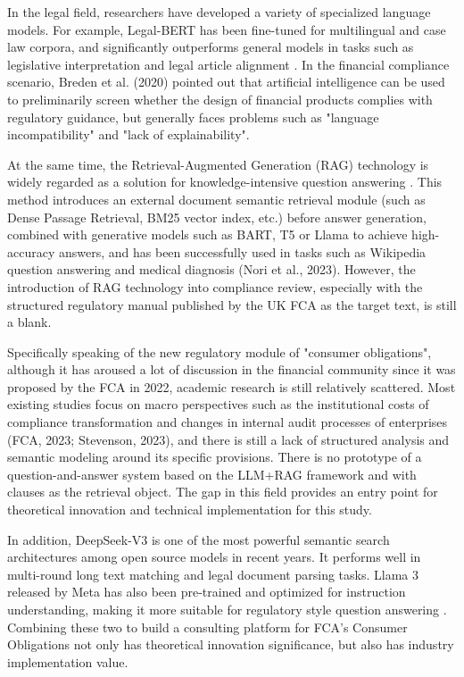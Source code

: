 \documentclass[a4paper,11pt]{article}
\begin{document}
In the legal field, researchers have developed a variety of specialized language models. For example, Legal-BERT has been fine-tuned for multilingual and case law corpora, and significantly outperforms general models in tasks such as legislative interpretation and legal article alignment \cite{chalkidis2020legalbert}. In the financial compliance scenario, Breden et al. (2020) pointed out that artificial intelligence can be used to preliminarily screen whether the design of financial products complies with regulatory guidance, but generally faces problems such as "language incompatibility" and "lack of explainability".

At the same time, the Retrieval-Augmented Generation (RAG) technology is widely regarded as a solution for knowledge-intensive question answering \cite{lewis2020rag}. This method introduces an external document semantic retrieval module (such as Dense Passage Retrieval, BM25 vector index, etc.) before answer generation, combined with generative models such as BART, T5 or Llama to achieve high-accuracy answers, and has been successfully used in tasks such as Wikipedia question answering \cite{karpukhin2020dense} and medical diagnosis (Nori et al., 2023). However, the introduction of RAG technology into compliance review, especially with the structured regulatory manual published by the UK FCA as the target text, is still a blank.

Specifically speaking of the new regulatory module of "consumer obligations", although it has aroused a lot of discussion in the financial community since it was proposed by the FCA in 2022, academic research is still relatively scattered. Most existing studies focus on macro perspectives such as the institutional costs of compliance transformation and changes in internal audit processes of enterprises (FCA, 2023; Stevenson, 2023), and there is still a lack of structured analysis and semantic modeling around its specific provisions. There is no prototype of a question-and-answer system based on the LLM+RAG framework and with clauses as the retrieval object. The gap in this field provides an entry point for theoretical innovation and technical implementation for this study.

In addition, DeepSeek-V3 is one of the most powerful semantic search architectures among open source models in recent years. It performs well in multi-round long text matching and legal document parsing tasks. Llama 3 released by Meta has also been pre-trained and optimized for instruction understanding, making it more suitable for regulatory style question answering \cite{meta2024llama3}. Combining these two to build a consulting platform for FCA's Consumer Obligations not only has theoretical innovation significance, but also has industry implementation value.
\end{document}
